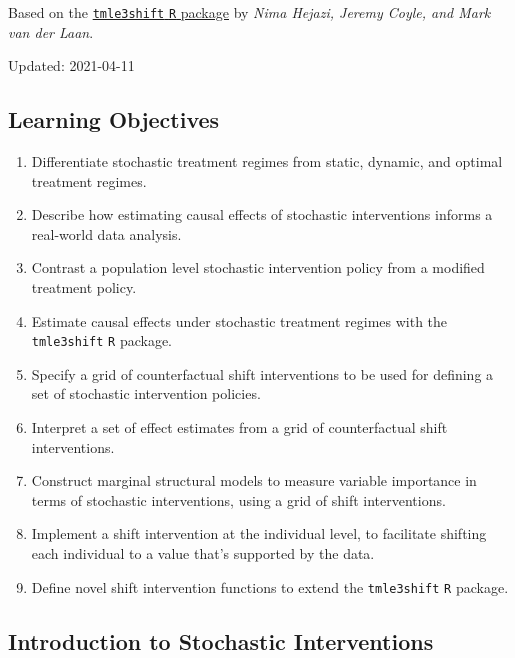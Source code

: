 \documentclass[12pt, krantz2,]{krantz}
\providecommand{\tightlist}{%
  \setlength{\itemsep}{0pt}\setlength{\parskip}{0pt}}
\theoremstyle{definition}
\theoremstyle{definition}
\theoremstyle{definition}
\newcommand{\1}{\mathbbm{1}}
\begin{document}
Based on the \href{https://github.com/tlverse/tmle3shift}{\texttt{tmle3shift} \texttt{R} package}
by \emph{Nima Hejazi, Jeremy Coyle, and Mark van der Laan}.

Updated: 2021-04-11

\hypertarget{learning-objectives-5}{%
\subsection{Learning Objectives}\label{learning-objectives-5}}

\begin{enumerate}
\def\labelenumi{\arabic{enumi}.}
\tightlist
\item
  Differentiate stochastic treatment regimes from static, dynamic, and optimal
  treatment regimes.
\item
  Describe how estimating causal effects of stochastic interventions informs a
  real-world data analysis.
\item
  Contrast a population level stochastic intervention policy from a modified
  treatment policy.
\item
  Estimate causal effects under stochastic treatment regimes with the
  \texttt{tmle3shift} \texttt{R} package.
\item
  Specify a grid of counterfactual shift interventions to be used for defining
  a set of stochastic intervention policies.
\item
  Interpret a set of effect estimates from a grid of counterfactual shift
  interventions.
\item
  Construct marginal structural models to measure variable importance in terms
  of stochastic interventions, using a grid of shift interventions.
\item
  Implement a shift intervention at the individual level, to facilitate
  shifting each individual to a value that's supported by the data.
\item
  Define novel shift intervention functions to extend the \texttt{tmle3shift} \texttt{R}
  package.
\end{enumerate}

\hypertarget{introduction-to-stochastic-interventions}{%
\subsection{Introduction to Stochastic Interventions}\label{introduction-to-stochastic-interventions}}
\end{document}
